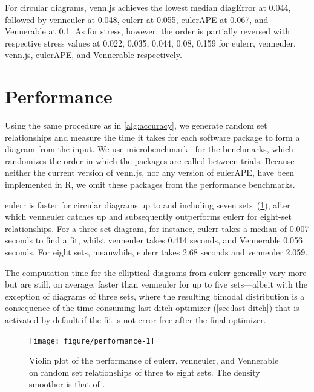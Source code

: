 \documentclass[
  oneside,
  openany,
  numbers=noendperiod,
  parskip=half,
  bibliography=totoc
]{scrbook}\usepackage[]{graphicx}\usepackage{xcolor}
\newenvironment{knitrout}{}{} %
\newcommand{\pkg}[1]{{\fontseries{b}\selectfont #1}}
\begin{document}
For circular diagrams, \pkg{venn.js} achieves the lowest median diagError at
0.044, followed by \pkg{venneuler} at 0.048,
\pkg{eulerr} at 0.055, \pkg{eulerAPE} at 0.067,
and \pkg{Vennerable} at 0.1. As for stress, however, the order is
partially reversed with respective stress values at
0.022, 0.035, 0.044, 0.08,
0.159 for
\pkg{eulerr}, \pkg{venneuler}, \pkg{venn.js}, \pkg{eulerAPE}, and \pkg{Vennerable}
respectively.

\section{Performance}
\label{sec:performance}

Using the same procedure as in \cref{alg:accuracy}, we generate random set
relationships and measure the time it takes for each software package to form a
diagram from the input. We use \pkg{microbenchmark}~\citep{Ooms_2017} for the benchmarks,
which randomizes the order in which the packages are called between trials.
Because neither the current version of \pkg{venn.js}, nor any version of \pkg{eulerAPE},
have been implemented in R, we omit these packages from the
performance benchmarks.



\pkg{eulerr} is faster for circular diagrams up to and including seven
sets~(\cref{fig:performance}), after which \pkg{venneuler} catches
up and subsequently outperforms \pkg{eulerr} for eight-set relationships. For a three-set diagram,
for instance, \pkg{eulerr} takes a median of
0.007
seconds to find a fit, whilst \pkg{venneuler} takes 0.414
seconds, and \pkg{Vennerable} 0.056
seconds. For eight sets, meanwhile, \pkg{eulerr} takes
2.68
seconds and \pkg{venneuler} 2.059.

The computation time for the elliptical
diagrams from \pkg{eulerr} generally vary more but are still, on average,
faster than \pkg{venneuler} for up to five sets---albeit with the exception
of diagrams of three sets, where the resulting bimodal distribution is a
consequence of the time-consuming
last-ditch optimizer (\cref{sec:last-ditch}) that is activated by default
if the fit is not error-free after the final optimizer.

\begin{figure}[hbtp]
\begin{knitrout}\small
{}\color{fgcolor}

{\centering \texttt{[image: figure/performance-1]} 

}



\end{knitrout}
\caption{Violin plot of the performance of \pkg{eulerr}, \pkg{venneuler}, and \pkg{Vennerable} on
random set relationships of three to eight sets. The density smoother is that of \citet{Sheather_1991}.}
\label{fig:performance}
\end{figure}
\end{document}
